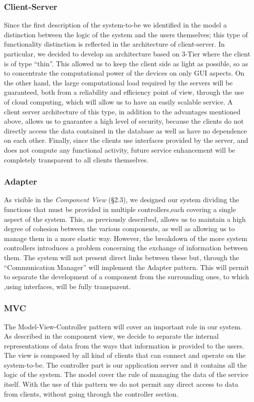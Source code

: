 \documentclass[10pt, a4paper,titlepage]{article}
\begin{document}
\subsubsection*{Client-Server}
Since the first description of the system-to-be we identified in the model a distinction between the logic of the system and the users themselves; this type of functionality distinction is reflected in the architecture of client-server.
In particular, we decided to develop an architecture based on 3-Tier where the client is of type “thin”.
This allowed us to keep the client side as light as possible, so as to concentrate the computational power of the devices on only GUI aspects. 
On the other hand, the large computational load required by the servers will be guaranteed, both from a reliability and efficiency point of view, through the use of cloud computing, which will allow us to have an easily scalable service.
A client server architecture of this type, in addition to the advantages mentioned above, allows us to guarantee a high level of security, because the clients do not directly access the data contained in the database as well as have no dependence on each other.
Finally, since the clients use interfaces provided by the server, and does not compute any functional activity, future service enhancement will be completely transparent to all clients themselves.
\subsubsection*{Adapter}
As visible in the \emph{Component View} (\S 2.3), we designed our system dividing the functions that must be provided in multiple controllers,each covering a single aspect of the system.
This, as previously described, allows us to maintain a high degree of cohesion between the various components, as well as allowing us to manage them in a more elastic way.
However, the breakdown of the more system controllers introduces a problem concerning the exchange of information between them. The system will not present direct links between these but, through the “Communication Manager” will implement the Adapter pattern. This will permit to separate the development of a component from the surrounding ones, to which ,using interfaces, will be fully transparent.
\subsubsection*{MVC}
The Model-View-Controller pattern will cover an important role in our system. As described in the component view, we decide to separate the internal representations of data from the ways that information is provided to the users. 
The view is composed by all kind of clients that can connect and operate on the system-to-be.
The controller part is our application server and it contains all the logic of the system.
The model cover the rule of managing the data of the service itself.
With the use of this pattern we do not permit any direct access to data from clients, without going through the controller section.
\end{document}
